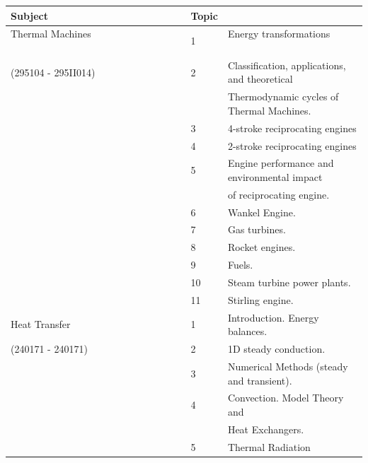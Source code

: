 \documentclass{article}
\begin{document}
\begin{tabular}{l l l }
{\bf Subject}       &  {\bf Topic}  & $\ $                                                 \\  
\hline
Thermal Machines $\quad\quad\quad\quad\quad\quad\quad\quad\quad\quad\quad\quad\quad\ \ $ & 1 &  Energy transformations  $\quad\quad\quad\ $          \\
(295104 - 295II014)                 &   2  &  Classification, applications, and theoretical      \\
$\ $                &   $\ $        &  Thermodynamic cycles of Thermal Machines.  \\
$\ $                & 3             &  4-stroke reciprocating engines              \\
$\ $                & 4             &  2-stroke reciprocating engines                                          \\
$\ $                & 5             &  Engine performance and environmental impact   \\ 
$\ $                & $\ $          &  of reciprocating engine.  \\
$\ $                & 6             &  Wankel Engine.  \\
$\ $                & 7             &  Gas turbines.  \\
$\ $                & 8             &  Rocket engines.  \\
$\ $                & 9             &  Fuels.  \\
$\ $                & 10            &  Steam turbine power plants.  \\
$\ $                & 11            &  Stirling engine.  \\
\hline
Heat Transfer       & 1             &  Introduction. Energy balances.              \\
(240171 - 240171)   & 2             &  1D steady conduction.                           \\
$\ $                & 3             &  Numerical Methods (steady and transient).  \\
$\ $                & 4             &  Convection. Model Theory and              \\
$\ $                & $\ $          &  Heat Exchangers.              \\
$\ $                & 5             &  Thermal Radiation                               \\
\hline
\end{tabular}
\end{document}
